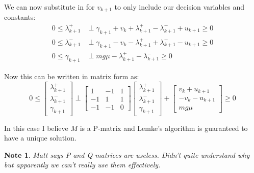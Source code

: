 \documentclass{article}
\newtheorem{note}{Note}
\begin{document}
We can now substitute in for $v_{k+1}$ to only include our decision variables and constants:
\begin{align*}
    0 \leq \lambda^+_{k+1} &\perp \gamma_{k+1} + v_k + \lambda^+_{k+1} - \lambda^-_{k+1} + u_{k+1} \geq 0 \\
    0 \leq \lambda^-_{k+1} &\perp \gamma_{k+1} - v_k - \lambda^+_{k+1} + \lambda^-_{k+1} - u_{k+1} \geq 0 \\
    0 \leq \gamma_{k+1} &\perp m g \mu - \lambda^+_{k+1} - \lambda^-_{k+1} \geq 0
\end{align*}

Now this can be written in matrix form as:
\[
    0 \leq 
    \begin{bmatrix}
        \lambda^+_{k+1} \\
        \lambda^-_{k+1} \\
        \gamma_{k+1}
    \end{bmatrix}
    \perp
    \begin{bmatrix}
        1 & -1 & 1 \\
        -1 & 1 & 1 \\
        -1 & -1 & 0
    \end{bmatrix}
    \begin{bmatrix}
        \lambda^+_{k+1} \\
        \lambda^-_{k+1} \\
        \gamma_{k+1}
    \end{bmatrix}
    +
    \begin{bmatrix}
        v_k + u_{k+1} \\
        -v_k - u_{k+1} \\
        m g \mu
    \end{bmatrix}
    \geq 0
\]

In this case I believe $M$ is a P-matrix and Lemke's algorithm is guaranteed to have a unique solution.

\begin{note}
    Matt says P and Q matrices are useless. Didn't quite understand why but apparently we can't really use them effectively.
\end{note}
\end{document}
